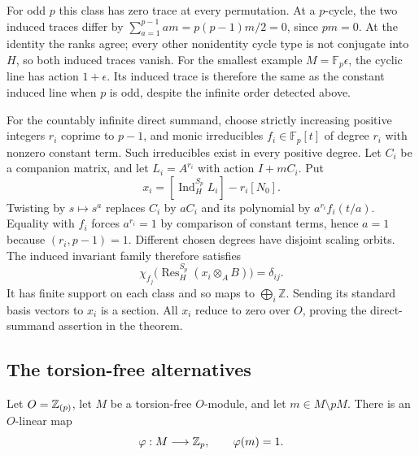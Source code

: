 For odd $p$ this class has zero trace at every permutation.  At a
$p$-cycle, the two induced traces differ by
$\sum_{a=1}^{p-1}am=p(p-1)m/2=0$, since $pm=0$.
At the identity the ranks agree; every other nonidentity cycle type
is not conjugate into $H$, so both induced traces vanish.
For the smallest example $M=\mathbb F_p\epsilon$, the cyclic
line has action $1+\epsilon$.  Its induced trace is therefore the
same as the constant induced line when $p$ is odd, despite the
infinite order detected above.


For the countably infinite direct summand, choose strictly
increasing positive integers $r_i$ coprime to $p-1$, and monic
irreducibles $f_i\in\mathbb F_p[t]$ of degree $r_i$ with nonzero
constant term.  Such irreducibles exist in every positive degree.
Let $C_i$ be a companion matrix, and let $L_i=A^{r_i}$ with action
$I+mC_i$.  Put
\[
 x_i=[\operatorname{Ind}_{H}^{S_p}L_i]-r_i[N_0].
\]
Twisting by $s\mapsto s^a$ replaces $C_i$ by $aC_i$ and its
polynomial by $a^{r_i}f_i(t/a)$.  Equality with $f_i$ forces
$a^{r_i}=1$ by comparison of constant terms, hence $a=1$ because
$(r_i,p-1)=1$.  Different chosen degrees have disjoint scaling
orbits.  The induced invariant family therefore satisfies
\[
 \chi_{f_j}\bigl(\operatorname{Res}_{H}^{S_p}(x_i\otimes_A B)\bigr)
 =\delta_{ij}.
\]
It has finite support on each class and so maps to
$\bigoplus_i\mathbb Z$.  Sending its standard basis vectors to
$x_i$ is a section.  All $x_i$ reduce to zero over $O$, proving the
direct-summand assertion in the theorem.

\subsection{The torsion-free alternatives}

\begin{lemma}\label{lem:padic-separation}
Let $O=\mathbb Z_{(p)}$, let $M$ be a torsion-free $O$-module, and let
$m\in M\setminus pM$.  There is an $O$-linear map
\[
 \varphi:M\longrightarrow\mathbb Z_p,\qquad \varphi(m)=1.
\]
\end{lemma}

